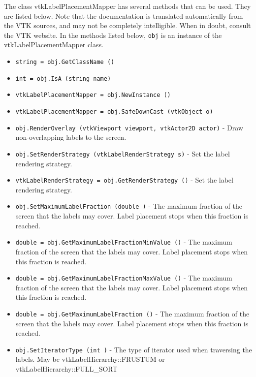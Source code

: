 The class vtkLabelPlacementMapper has several methods that can be used.
  They are listed below.
Note that the documentation is translated automatically from the VTK sources,
and may not be completely intelligible.  When in doubt, consult the VTK website.
In the methods listed below, \verb|obj| is an instance of the vtkLabelPlacementMapper class.
\begin{itemize}
\item  \verb|string = obj.GetClassName ()|

\item  \verb|int = obj.IsA (string name)|

\item  \verb|vtkLabelPlacementMapper = obj.NewInstance ()|

\item  \verb|vtkLabelPlacementMapper = obj.SafeDownCast (vtkObject o)|

\item  \verb|obj.RenderOverlay (vtkViewport viewport, vtkActor2D actor)| -  Draw non-overlapping labels to the screen.

\item  \verb|obj.SetRenderStrategy (vtkLabelRenderStrategy s)| -  Set the label rendering strategy.

\item  \verb|vtkLabelRenderStrategy = obj.GetRenderStrategy ()| -  Set the label rendering strategy.

\item  \verb|obj.SetMaximumLabelFraction (double )| -  The maximum fraction of the screen that the labels may cover.
 Label placement stops when this fraction is reached.

\item  \verb|double = obj.GetMaximumLabelFractionMinValue ()| -  The maximum fraction of the screen that the labels may cover.
 Label placement stops when this fraction is reached.

\item  \verb|double = obj.GetMaximumLabelFractionMaxValue ()| -  The maximum fraction of the screen that the labels may cover.
 Label placement stops when this fraction is reached.

\item  \verb|double = obj.GetMaximumLabelFraction ()| -  The maximum fraction of the screen that the labels may cover.
 Label placement stops when this fraction is reached.

\item  \verb|obj.SetIteratorType (int )| -  The type of iterator used when traversing the labels.
 May be vtkLabelHierarchy::FRUSTUM or vtkLabelHierarchy::FULL\_SORT


\end{itemize}
